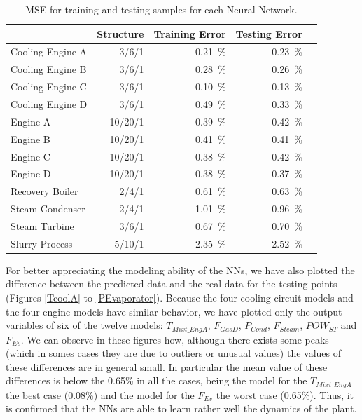\begin{table}[!t]
\caption{MSE for training and testing samples for each Neural Network.}
\label{tbl:mse}
  \centering
\begin{tabular}{lrrrr} \toprule
 & Structure  & Training Error & Testing Error \\ \midrule
Cooling Engine A & 3/6/1 & \SI{0.21}{\percent} & \SI{0.23}{\percent} \\
Cooling Engine B & 3/6/1  & \SI{0.28}{\percent} & \SI{0.26}{\percent} \\
Cooling Engine C & 3/6/1  & \SI{0.10}{\percent} & \SI{0.13}{\percent} \\
Cooling Engine D & 3/6/1  & \SI{0.49}{\percent} & \SI{0.33}{\percent} \\
 Engine A & 10/20/1  & \SI{0.39}{\percent} & \SI{0.42}{\percent} \\
 Engine B & 10/20/1  & \SI{0.41}{\percent} & \SI{0.41}{\percent} \\
 Engine C & 10/20/1  & \SI{0.38}{\percent} & \SI{0.42}{\percent} \\
 Engine D & 10/20/1  & \SI{0.38}{\percent} & \SI{0.37}{\percent} \\
 Recovery Boiler & 2/4/1  & \SI{0.61}{\percent} & \SI{0.63}{\percent} \\
 Steam Condenser & 2/4/1  & \SI{1.01}{\percent} & \SI{0.96}{\percent} \\
 Steam Turbine & 3/6/1  & \SI{0.67}{\percent} & \SI{0.70}{\percent} \\
 Slurry Process & 5/10/1  & \SI{2.35}{\percent} & \SI{2.52}{\percent} \\
 \bottomrule
\end{tabular}
\vspace{-0.3cm}

\end{table}

For better appreciating the modeling ability of the NNs, we have also plotted the difference between the predicted data and the real data for the testing points (Figures \ref{TcoolA} to \ref{PEvaporator}). Because the four cooling-circuit models and the four engine models have  similar behavior, we have plotted only the output variables of six of the twelve models: $T_{Mixt\_EngA}$, $F_{GasD}$, $P_{Cond}$, $F_{Steam}$, $POW_{ST}$ and $F_{Ev}$.  We can observe in these figures how, although there exists some peaks (which in somes cases they are due to outliers or unusual values) the values of these differences are in general small. In particular the mean value of these differences is below the 0.65\% in all the cases, being the model for the $T_{Mixt\_EngA}$ the best case (0.08\%) and the model for the $F_{Ev}$ the worst case (0.65\%). Thus, it is confirmed that the NNs are able to learn rather well the dynamics of the plant.


